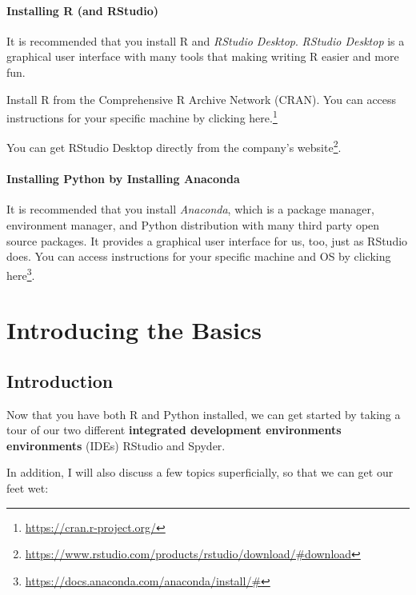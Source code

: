 \documentclass[
  12pt,
]{krantz}
\renewcommand{\href}[2]{#2\footnote{\url{#1}}}
\begin{document}
\hypertarget{installing-r-and-rstudio}{%
\subsection*{Installing R (and RStudio)}\label{installing-r-and-rstudio}}


It is recommended that you install R and \emph{RStudio Desktop}. \emph{RStudio Desktop} is a graphical user interface with many tools that making writing R easier and more fun.

Install R from the Comprehensive R Archive Network (CRAN). You can access instructions for your specific machine by clicking \href{https://cran.r-project.org/}{here.}

You can get RStudio Desktop directly from the \href{https://www.rstudio.com/products/rstudio/download/\#download}{company's website}.

\hypertarget{installing-python-by-installing-anaconda}{%
\subsection*{Installing Python by Installing Anaconda}\label{installing-python-by-installing-anaconda}}


It is recommended that you install \emph{Anaconda}, which is a package manager, environment manager, and Python distribution with many third party open source packages. It provides a graphical user interface for us, too, just as RStudio does. You can access instructions for your specific machine and OS by clicking \href{https://docs.anaconda.com/anaconda/install/\#}{here}.

\mainmatter

\hypertarget{part-introducing-the-basics}{%
\part{Introducing the Basics}\label{part-introducing-the-basics}}

\hypertarget{intro}{%
\chapter{Introduction}\label{intro}}

Now that you have both R and Python installed, we can get started by taking a tour of our two different \textbf{integrated development environments environments} (IDEs) RStudio and Spyder.

In addition, I will also discuss a few topics superficially, so that we can get our feet wet:
\end{document}
